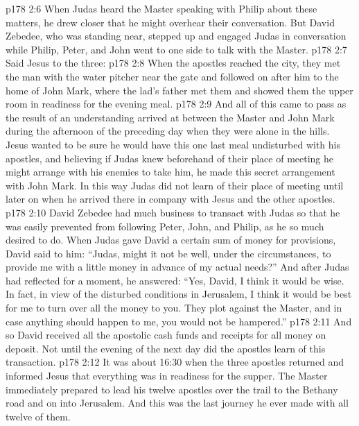 \vs p178 2:6 When Judas heard the Master speaking with Philip about these matters, he drew closer that he might overhear their conversation. But David Zebedee, who was standing near, stepped up and engaged Judas in conversation while Philip, Peter, and John went to one side to talk with the Master.
\vs p178 2:7 Said Jesus to the three: 
\vs p178 2:8 When the apostles reached the city, they met the man with the water pitcher near the gate and followed on after him to the home of John Mark, where the lad’s father met them and showed them the upper room in readiness for the evening meal.
\vs p178 2:9 And all of this came to pass as the result of an understanding arrived at between the Master and John Mark during the afternoon of the preceding day when they were alone in the hills. Jesus wanted to be sure he would have this one last meal undisturbed with his apostles, and believing if Judas knew beforehand of their place of meeting he might arrange with his enemies to take him, he made this secret arrangement with John Mark. In this way Judas did not learn of their place of meeting until later on when he arrived there in company with Jesus and the other apostles.
\vs p178 2:10 \pc David Zebedee had much business to transact with Judas so that he was easily prevented from following Peter, John, and Philip, as he so much desired to do. When Judas gave David a certain sum of money for provisions, David said to him: “Judas, might it not be well, under the circumstances, to provide me with a little money in advance of my actual needs?” And after Judas had reflected for a moment, he answered: “Yes, David, I think it would be wise. In fact, in view of the disturbed conditions in Jerusalem, I think it would be best for me to turn over all the money to you. They plot against the Master, and in case anything should happen to me, you would not be hampered.”
\vs p178 2:11 And so David received all the apostolic cash funds and receipts for all money on deposit. Not until the evening of the next day did the apostles learn of this transaction.
\vs p178 2:12 \pc It was about 16:30 when the three apostles returned and informed Jesus that everything was in readiness for the supper. The Master immediately prepared to lead his twelve apostles over the trail to the Bethany road and on into Jerusalem. And this was the last journey he ever made with all twelve of them.

